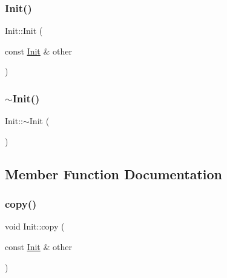 \mbox{\label{classInit_a9d26400c5fabf20571808ad773524669}} 
\subsubsection{\texorpdfstring{Init()}{Init()}\hspace{0.1cm}{\footnotesize\ttfamily [2/2]}}
{\footnotesize\ttfamily Init\+::\+Init (\begin{DoxyParamCaption}\item[{const \hyperlink{classInit}{Init} \&}]{other }\end{DoxyParamCaption})}

\mbox{\label{classInit_a67d5c94cb965fa3b774e969cfb4969d1}} 
\subsubsection{\texorpdfstring{$\sim$\+Init()}{~Init()}}
{\footnotesize\ttfamily Init\+::$\sim$\+Init (\begin{DoxyParamCaption}{ }\end{DoxyParamCaption})\hspace{0.3cm}{\ttfamily [virtual]}}



\subsection{Member Function Documentation}
\mbox{\label{classInit_a045745f591e312608e5ee3639f4459ba}} 
\subsubsection{\texorpdfstring{copy()}{copy()}}
{\footnotesize\ttfamily void Init\+::copy (\begin{DoxyParamCaption}\item[{const \hyperlink{classInit}{Init} \&}]{other }\end{DoxyParamCaption})\hspace{0.3cm}{\ttfamily [private]}}

\mbox{\label{classInit_ad1e6c6b247eae6eaac5dd8e9dc9cdce0}} 

